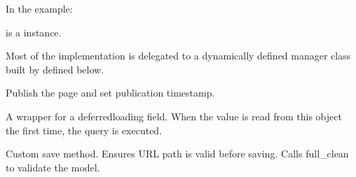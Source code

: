 \documentclass[letterpaper,10pt,english]{sphinxmanual}
\begin{document}
\begin{fulllineitems}
\begin{fulllineitems}
\sphinxAtStartPar
In the example:

\begin{sphinxVerbatim}[commandchars=\\\{\}]
 
       
\end{sphinxVerbatim}

\sphinxAtStartPar
{} is a  instance.

\sphinxAtStartPar
Most of the implementation is delegated to a dynamically defined manager
class built by  defined below.

\end{fulllineitems}


\begin{fulllineitems}
\label{\detokenize{pages_app.models:pages_app.models.Page.publish}}
\pysigstartsignatures
\pysiglinewithargsret
{}
{}
{}
\pysigstopsignatures
\sphinxAtStartPar
Publish the page and set publication timestamp.

\end{fulllineitems}


\begin{fulllineitems}
\label{\detokenize{pages_app.models:id38}}
\pysigstartsignatures
\pysigline
{}
\pysigstopsignatures
\sphinxAtStartPar
A wrapper for a deferred\sphinxhyphen{}loading field. When the value is read from this
object the first time, the query is executed.

\end{fulllineitems}


\begin{fulllineitems}
\label{\detokenize{pages_app.models:pages_app.models.Page.save}}
\pysigstartsignatures
\pysiglinewithargsret
{}
{\sphinxparamcomma {}}
{}
\pysigstopsignatures
\sphinxAtStartPar
Custom save method.
Ensures URL path is valid before saving.
Calls full\_clean to validate the model.


\end{fulllineitems}
\end{fulllineitems}
\end{document}
